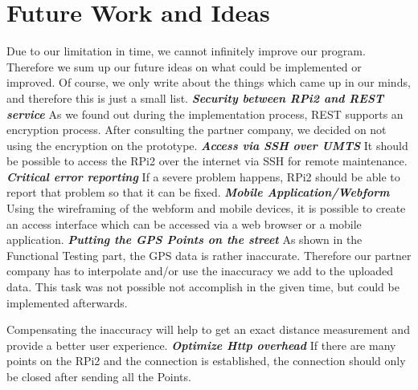 \chapter{Future Work and Ideas}
Due to our limitation in time, we cannot infinitely improve our program. Therefore we sum up our future ideas on what could be implemented or improved. Of course, we only write about the things which came up in our minds, and therefore this is just a small list.
\newline \newline
\textbf{\textit{Security between RPi2 and REST service}} \newline
As we found out during the implementation process, REST supports an encryption process. After consulting the partner company, we decided on not using the encryption on the prototype.
\newline \newline
\textbf{\textit{Access via SSH over UMTS}}
\newline
It should be possible to access the RPi2 over the internet via SSH for remote maintenance.
\newline \newline
\textbf{\textit{Critical error reporting}}
\newline
If a severe problem happens, RPi2 should be able to report that problem so that it can be fixed.
\newline \newline
\textbf{\textit{Mobile Application/Webform}}
\newline
Using the wireframing of the webform and mobile devices, it is possible to create an access interface which can be accessed via a web browser or a mobile application.
\newline \newline
\textbf{\textit{Putting the GPS Points on the street}}
\newline
As shown in the Functional Testing part, the GPS data is rather inaccurate. Therefore our partner company has to interpolate and/or use the inaccuracy we add to the uploaded data. This task was not possible not accomplish in the given time, but could be implemented afterwards.

Compensating the inaccuracy will help to get an exact distance measurement and provide a better user experience.
\newline \newline
\textbf{\textit{Optimize Http overhead}}
\newline
If there are many points on the RPi2  and the connection is established, the connection should only be closed after sending all the Points.
